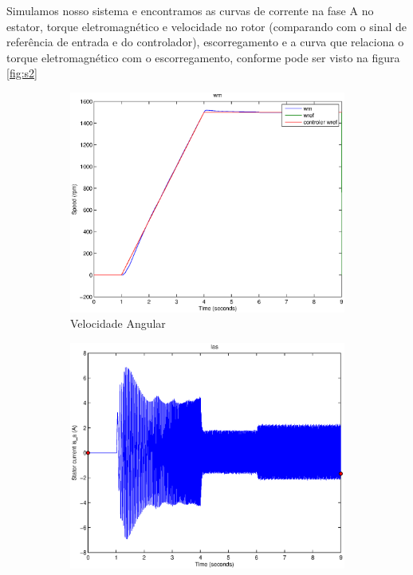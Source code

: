 \documentclass{article}
\begin{document}
Simulamos nosso sistema e encontramos as curvas de corrente na fase A no estator, torque eletromagnético e velocidade no rotor (comparando com o sinal de referência de entrada e do controlador), escorregamento e a curva que relaciona o torque eletromagnético com o escorregamento, conforme pode ser visto na figura \ref{fig:s2}

\begin{figure}[H]
	\centering
	\begin{subfigure}[b]{0.49\linewidth}
		\includegraphics[width=\linewidth]{matlab/wm2}
		\caption{Velocidade Angular}
	\end{subfigure}
	\begin{subfigure}[b]{0.49\linewidth}
		\centering
		\includegraphics[width=\linewidth]{matlab/ias2}

\end{subfigure}
\end{figure}
\end{document}
